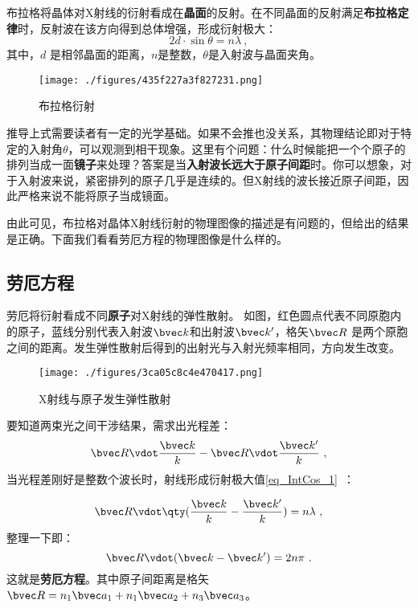 布拉格将晶体对X射线的衍射看成在\textbf{晶面}的反射。在不同晶面的反射满足\textbf{布拉格定律}时，反射波在该方向得到总体增强，形成衍射极大：
\begin{equation}\label{eq_RecLat_1}
2d \cdot \sin\theta = n\lambda~,
\end{equation}
其中，$d$ 是相邻晶面的距离，$n$是整数，$\theta$是入射波与晶面夹角。
\begin{figure}[ht]
\centering
\texttt{[image: ./figures/435f227a3f827231.png]}
\caption{布拉格衍射} \label{fig_RecLat_2}
\end{figure}
推导上式需要读者有一定的光学基础。如果不会推也没关系，其物理结论即对于特定的入射角$\theta$，可以观测到相干现象。这里有个问题：什么时候能把一个个原子的排列当成一面\textbf{镜子}来处理？答案是当\textbf{入射波长远大于原子间距}时。你可以想象，对于入射波来说，紧密排列的原子几乎是连续的。但X射线的波长接近原子间距，因此严格来说不能将原子当成镜面。

由此可见，布拉格对晶体X射线衍射的物理图像的描述是有问题的，但给出的结果是正确。下面我们看看劳厄方程的物理图像是什么样的。

\subsection{劳厄方程}
劳厄将衍射看成不同\textbf{原子}对X射线的弹性散射。
如图，红色圆点代表不同原胞内的原子，蓝线分别代表入射波$\bvec k$和出射波$\bvec k'$，格矢$\bvec R$ 是两个原胞之间的距离。发生弹性散射后得到的出射光与入射光频率相同，方向发生改变。

\begin{figure}[ht]
\centering
\texttt{[image: ./figures/3ca05c8c4e470417.png]}
\caption{X射线与原子发生弹性散射} \label{fig_RecLat_3}
\end{figure}

要知道两束光之间干涉结果，需求出光程差：
\begin{equation}
\bvec R \vdot \dfrac{\bvec k}{k} - \bvec R \vdot \dfrac{\bvec k'}{k} ~,
\end{equation}
当光程差刚好是整数个波长时，射线形成衍射极大值\autoref{eq_IntCos_1}~：

\begin{align}
\bvec R \vdot \qty( \dfrac{\bvec k}{k} - \dfrac{\bvec k'}{k} ) &= n\lambda ~,\\
\end{align}
整理一下即：
\begin{equation}\label{eq_RecLat_2}
\bvec R \vdot( \bvec k - \bvec k') = 2n\pi~.
\end{equation}
这就是\textbf{劳厄方程}。其中原子间距离是格矢$\bvec R = n_1 \bvec a_1 +  n_1 \bvec a_2 + n_3 \bvec a_3$。 





